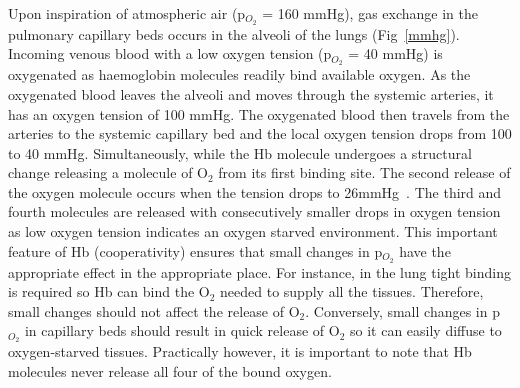 Upon inspiration of atmospheric air (p$_{O_2}$ = 160 mmHg), gas exchange in the pulmonary capillary beds occurs in the alveoli of the lungs (Fig~\ref{mmhg}).
Incoming venous blood with a low oxygen tension (p$_{O_2}$ = 40 mmHg) is oxygenated as haemoglobin molecules readily bind available oxygen. 
As the oxygenated blood leaves the alveoli and moves through the systemic arteries, it has an oxygen tension of 100 mmHg. 
The oxygenated blood then travels from the arteries to the systemic capillary bed and the local oxygen tension drops from 100 to 40 mmHg.
Simultaneously, while the \acs{Hb} molecule undergoes a structural change releasing a molecule of O$_2$ from its first binding site.  
The second release of the oxygen molecule occurs when the tension drops to 26mmHg~\cite{GomezCambronero:2001hu}. 
The third and fourth molecules are released with consecutively smaller drops in oxygen tension as low oxygen tension indicates an oxygen starved environment. This important feature of \acs{Hb} (cooperativity) ensures that small changes in p$_{O_2}$ have the appropriate effect in the appropriate place. 
For instance, in the lung tight binding is required so \acs{Hb} can bind the O$_2$ needed to supply all the tissues.
Therefore, small changes should not affect the release of O$_2$.
Conversely, small changes in p$_{O_2}$ in capillary beds should result in quick release of O$_2$ so it can easily diffuse to oxygen-starved tissues. 
Practically however, it is important to note that \acs{Hb} molecules never release all four of the bound oxygen.

